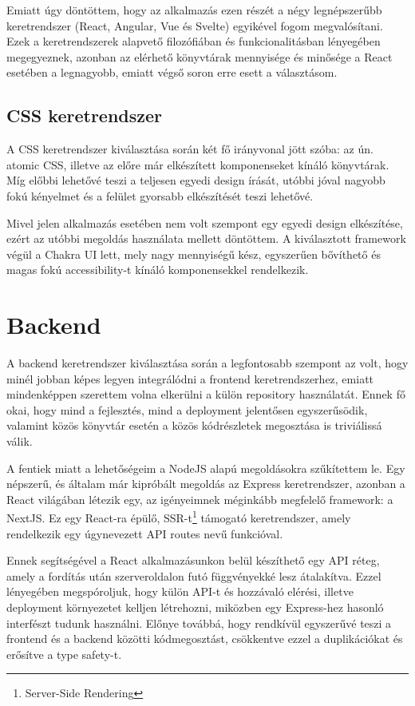 Emiatt úgy döntöttem, hogy az alkalmazás ezen részét a négy legnépszerűbb keretrendszer (React, Angular, Vue és Svelte) egyikével fogom megvalósítani.
Ezek a keretrendszerek alapvető filozófiában és funkcionalitásban lényegében megegyeznek, azonban az elérhető könyvtárak mennyisége és minősége a React esetében a legnagyobb, emiatt végső soron erre esett a választásom. \cite{React}

\subsection{CSS keretrendszer}
A CSS keretrendszer kiválasztása során két fő irányvonal jött szóba: az ún. atomic CSS, illetve az előre már elkészített komponenseket kínáló könyvtárak.
Míg előbbi lehetővé teszi a teljesen egyedi design írását, utóbbi jóval nagyobb fokú kényelmet és a felület gyorsabb elkészítését teszi lehetővé.

Mivel jelen alkalmazás esetében nem volt szempont egy egyedi design elkészítése, ezért az utóbbi megoldás használata mellett döntöttem.
A kiválasztott framework végül a Chakra UI lett, mely nagy mennyiségű kész, egyszerűen bővíthető és magas fokú accessibility-t kínáló komponensekkel rendelkezik. \cite{ChakraUI}

\section{Backend}
A backend keretrendszer kiválasztása során a legfontosabb szempont az volt, hogy minél jobban képes legyen integrálódni a frontend keretrendszerhez,
emiatt mindenképpen szerettem volna elkerülni a külön repository használatát.
Ennek fő okai, hogy mind a fejlesztés, mind a deployment jelentősen egyszerűsödik, valamint közös könyvtár esetén a közös kódrészletek megosztása is triviálissá válik.

A fentiek miatt a lehetőségeim a NodeJS alapú megoldásokra szűkítettem le. Egy népszerű, és általam már kipróbált megoldás az Express keretrendszer, azonban a React világában létezik egy, az igényeimnek méginkább megfelelő framework: a NextJS.
Ez egy React-ra épülő, SSR-t\footnote{Server-Side Rendering} támogató keretrendszer, amely rendelkezik egy úgynevezett API routes nevű funkcióval.

Ennek segítségével a React alkalmazásunkon belül készíthető egy API réteg, amely a fordítás után szerveroldalon futó függvényekké lesz átalakítva.
Ezzel lényegében megspóroljuk, hogy külön API-t és hozzávaló elérési, illetve deployment környezetet kelljen létrehozni, miközben egy Express-hez hasonló interfészt tudunk használni.
Előnye továbbá, hogy rendkívül egyszerűvé teszi a frontend és a backend közötti kódmegosztást, csökkentve ezzel a duplikációkat és erősítve a type safety-t.\cite{NextJS}

